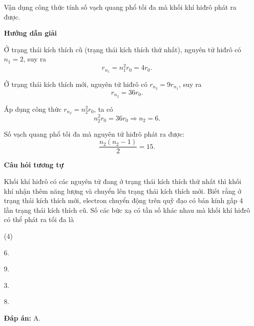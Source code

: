 \begin{dang}{Vận dụng công thức tính số vạch quang phổ tối đa mà khối khí hiđrô phát ra được.}
	{\begin{center}
			\textbf{Hướng dẫn giải}
		\end{center}
		
		Ở trạng thái kích thích cũ (trạng thái kích thích thứ nhất), nguyên tử hiđrô có $n_1= 2$, suy ra
		\begin{equation*}
			r_{n_1} = n_1 ^2 r_0 = 4 r_0.
		\end{equation*}
		
		Ở trạng thái kích thích mới, nguyên tử hiđrô có $r_{n_2} = 9 r_{n_1}$, suy ra
		\begin{equation*}
			r_{n _2} = 36 r_0.
		\end{equation*}
		
		Áp dụng công thức $r_{n_2} = n _2 ^2 r_0$, ta có
		\begin{equation*}
			n _2 ^2 r_0 = 36 r_0 \Rightarrow n _2 = 6 .
		\end{equation*}
		
		Số vạch quang phổ tối đa mà nguyên tử hiđrô phát ra được:
		\begin{equation*}
			\dfrac{n_2(n_2-1)}{2}=15.
		\end{equation*}
		
		\begin{center}
			\textbf{Câu hỏi tương tự}
		\end{center}
		
		Khối khí hiđrô có các nguyên tử đang ở trạng thái kích thích thứ nhất thì khối khí nhận thêm năng lượng và chuyển lên trạng thái kích thích mới. Biết rằng ở trạng thái kích thích mới, electron chuyển động trên quỹ đạo có bán kính gấp 4 lần trạng thái kích thích cũ. Số các bức xạ có tần số khác nhau mà khối khí hiđrô có thể phát ra tối đa là
		\begin{mcq}(4)
			\item 6.
			\item 9.
			\item 3.
			\item 8.
		\end{mcq}	
		
		\textbf{Đáp án:} A.
	}
	
\end{dang}




